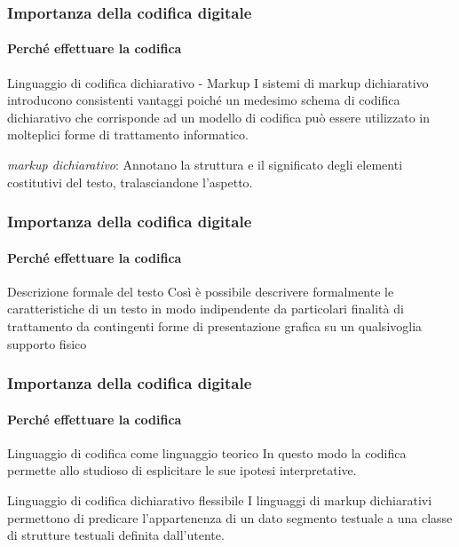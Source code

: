\begin{frame}
	\frametitle{Importanza della codifica digitale}
	\framesubtitle{Perché effettuare la codifica}
	\addtocounter{nframe}{1}

	\begin{block}{Linguaggio di codifica dichiarativo - Markup}
		I sistemi di markup dichiarativo introducono consistenti vantaggi poiché un medesimo schema di codifica dichiarativo che corrisponde ad un modello di codifica può essere utilizzato in molteplici forme di trattamento informatico.
	\end{block}

	\textit{markup dichiarativo}: Annotano la struttura e il significato degli elementi costitutivi del testo, tralasciandone l’aspetto.

\end{frame}

\begin{frame}
	\frametitle{Importanza della codifica digitale}
	\framesubtitle{Perché effettuare la codifica}
	\addtocounter{nframe}{1}

	\begin{block}{Descrizione formale del testo}
		Così è possibile descrivere formalmente le caratteristiche di un testo in modo indipendente da particolari finalità di trattamento da contingenti forme di presentazione grafica su un qualsivoglia supporto fisico
	\end{block}

\end{frame}


\begin{frame}
	\frametitle{Importanza della codifica digitale}
	\framesubtitle{Perché effettuare la codifica}
	\addtocounter{nframe}{1}

	\begin{block}{Linguaggio di codifica come linguaggio teorico}
		In questo modo la codifica permette allo studioso di esplicitare le sue ipotesi interpretative.
	\end{block}

	\begin{block}{Linguaggio di codifica dichiarativo flessibile}
		I linguaggi di markup dichiarativi permettono di predicare l’appartenenza di un dato segmento testuale a una classe di strutture testuali definita dall’utente.
	\end{block}

\end{frame}

